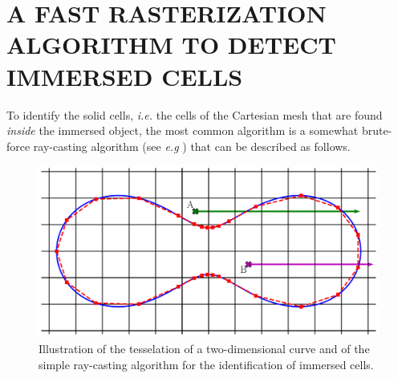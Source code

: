 \section{A FAST RASTERIZATION ALGORITHM TO DETECT IMMERSED CELLS}\label{sec:rasterization}
%
%

To identify the solid cells, \emph{i.e.} the cells of the Cartesian mesh that are found \emph{inside} the immersed object, the most common algorithm is a somewhat brute-force ray-casting algorithm (see \emph{e.g} \cite{haines1994point,mittal2005immersed}) that can be described as follows.

\begin{figure}[ht!]
    \centering
    \includegraphics[width=0.7\linewidth]{chapter3_numerical_methods/pictures/cassini_ellipsis.pdf}
    \caption{Illustration of the tesselation of a two-dimensional curve and of the simple ray-casting algorithm for the identification of immersed cells.}
    \label{fig:ray_casting_simple}
\end{figure}

